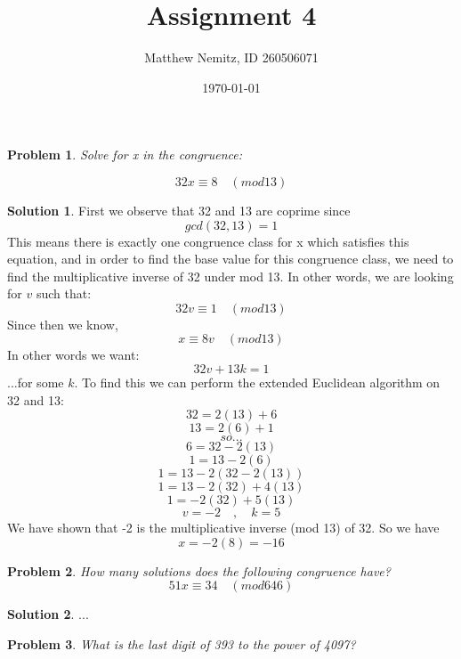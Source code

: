 \documentclass{article}
\newtheorem{problem}{Problem}
\theoremstyle{definition}
\newtheorem*{solution}{Solution}
\begin{document}
 \title{Assignment 4} 

\author{Matthew Nemitz, ID 260506071} 

\date{\today}

\maketitle

\begin{problem} 

Solve for x in the congruence:

\[ 32x \equiv 8 \quad (mod 13)\] 

\end{problem}

\begin{solution}
First we observe that 32 and 13 are coprime since \[gcd(32,13)=1\] This means there is exactly one congruence class for x which satisfies this equation, and in order to find the base value for this congruence class, we need to find the multiplicative inverse of 32 under mod 13. In other words, we are looking for $v$ such that: \[32v \equiv 1 \quad (mod 13)\] Since then we know,\[x \equiv 8v \quad(mod 13)\] In other words we want: \[32v + 13k = 1\] ...for some $k$.
To find this we can perform the extended Euclidean algorithm on 32 and 13:
\[32=2(13) + 6\]\[13=2(6)+1\]\[so...\]\[6=32-2(13)\]\[1=13-2(6)\]\[1=13-2(32-2(13))\]\[1=13-2(32)+4(13)\]\[1=-2(32)+5(13)\]\[v=-2 \quad , \quad k=5\]
We have shown that -2 is the multiplicative inverse (mod 13) of 32. So we have \[x = -2(8) = -16\]
\end{solution}
\begin{problem}
How many solutions does the following congruence have?
\[51x \equiv 34 \quad (mod 646)\]
\end{problem}
\begin{solution}
...
\end{solution}
\begin{problem}
	What is the last digit of 393 to the power of 4097?
\end{problem}
\end{document}
